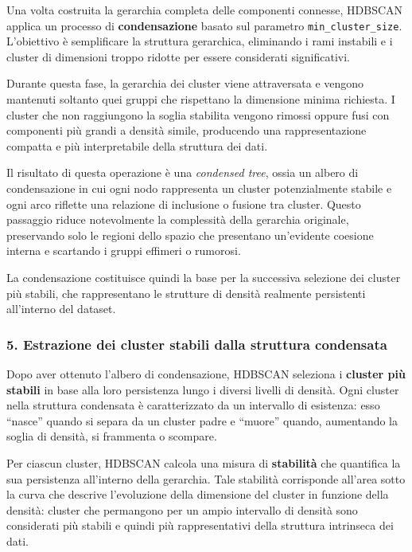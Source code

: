 Una volta costruita la gerarchia completa delle componenti connesse, HDBSCAN applica un processo di \textbf{condensazione} basato sul parametro \texttt{min\_cluster\_size}. 
L'obiettivo è semplificare la struttura gerarchica, eliminando i rami instabili e i cluster di dimensioni troppo ridotte per essere considerati significativi.

Durante questa fase, la gerarchia dei cluster viene attraversata e vengono mantenuti soltanto quei gruppi che rispettano la dimensione minima richiesta. 
I cluster che non raggiungono la soglia stabilita vengono rimossi oppure fusi con componenti più grandi a densità simile, producendo una rappresentazione compatta e più interpretabile della struttura dei dati.

Il risultato di questa operazione è una \textit{condensed tree}, ossia un albero di condensazione in cui ogni nodo rappresenta un cluster potenzialmente stabile e ogni arco riflette una relazione di inclusione o fusione tra cluster. 
Questo passaggio riduce notevolmente la complessità della gerarchia originale, preservando solo le regioni dello spazio che presentano un'evidente coesione interna e scartando i gruppi effimeri o rumorosi.

La condensazione costituisce quindi la base per la successiva selezione dei cluster più stabili, che rappresentano le strutture di densità realmente persistenti all'interno del dataset.
\subsubsection*{5. Estrazione dei cluster stabili dalla struttura condensata}

Dopo aver ottenuto l'albero di condensazione, HDBSCAN seleziona i \textbf{cluster più stabili} in base alla loro persistenza lungo i diversi livelli di densità. 
Ogni cluster nella struttura condensata è caratterizzato da un intervallo di esistenza: esso ``nasce'' quando si separa da un cluster padre e ``muore'' quando, aumentando la soglia di densità, si frammenta o scompare.

Per ciascun cluster, HDBSCAN calcola una misura di \textbf{stabilità} che quantifica la sua persistenza all'interno della gerarchia. 
Tale stabilità corrisponde all'area sotto la curva che descrive l'evoluzione della dimensione del cluster in funzione della densità: 
cluster che permangono per un ampio intervallo di densità sono considerati più stabili e quindi più rappresentativi della struttura intrinseca dei dati.

